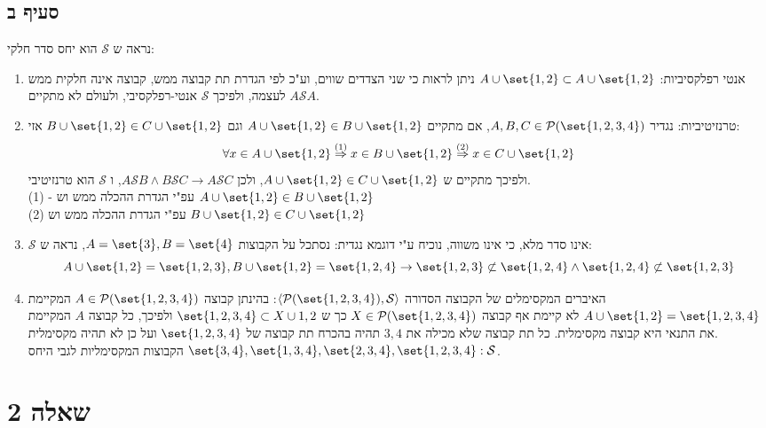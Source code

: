\documentclass{article}
\DeclarePairedDelimiter\set\{\}
\begin{document}
	\subsection*{סעיף ב}
נראה ש $\mathcal{S}$ הוא יחס סדר חלקי:
\begin{enumerate}
	\item אנטי רפלקסיביות:
	$A \cup \set{1,2} \subset A \cup \set{1,2}$
	ניתן לראות כי שני הצדדים שווים, וע"כ לפי הגדרת תת קבוצה ממש, קבוצה אינה חלקית ממש לעצמה,
	ולפיכך $\mathcal{S}$ אנטי-רפלקסיבי, ולעולם לא מתקיים $A\mathcal{S}A$.
	\item טרנזיטיביות:
	נגדיר $A,B,C \in \PP(\set{1,2,3,4})$,
	אם מתקיים $A \cup \set{1,2} \in B \cup \set{1,2}$
	וגם $B \cup \set{1,2} \in C \cup \set{1,2}$ אזי:
\[
	\forall x \in A \cup \set{1,2} \ontop{(1)}\Rightarrow
	x \in B \cup \set{1,2} \ontop{(2)}\Rightarrow
	x \in C \cup \set{1,2}
\]
ולפיכך מתקיים ש $A \cup \set{1,2} \in C \cup \set{1,2}$, ולכן
$A \mathcal{S} B \land B \mathcal{S} C \to A \mathcal{S} C$, ו $\mathcal{S}$ הוא טרנזיטיבי. \\
(1) -
עפ"י הגדרת ההכלה ממש וש $A \cup \set{1,2} \in B \cup \set{1,2}$ \\
(2) עפ"י הגדרת ההכלה ממש וש $B \cup \set{1,2} \in C \cup \set{1,2}$ \\
	\item $\mathcal{S}$ אינו סדר מלא, כי אינו משווה, נוכיח ע"י דוגמא נגדית:
	נסתכל על הקבוצות $A = \set{3}, B = \set{4}$, נראה ש:
	\[
		A \cup \set{1,2} = \set{1,2,3},  B \cup \set{1,2} = \set{1,2,4} \to \set{1,2,3} \not \subset \set{1,2,4} \land \set{1,2,4} \not \subset \set{1,2,3}
	\]
	\item האיברים המקסימלים של הקבוצה הסדורה $\langle \PP(\set{1,2,3,4}), \mathcal{S} \rangle$:
בהינתן קבוצה $A \in \PP(\set{1,2,3,4})$ המקיימת $A \cup \set{1,2} = \set{1,2,3,4}$
לא קיימת אף קבוצה $X \in \PP(\set{1,2,3,4})$ כך ש $\set{1,2,3,4} \subset X \cup{1,2}$
ולפיכך, כל קבוצה $A$ המקיימת את התנאי היא קבוצה מקסימלית.
כל תת קבוצה שלא מכילה את $3,4$  תהיה בהכרח תת קבוצה של $\set{1,2,3,4}$ ועל כן לא תהיה מקסימלית. \\
הקבוצות המקסימליות לגבי היחס $\set{3,4}, \set{1,3,4}, \set{2,3,4}, \set{1,2,3,4} :\mathcal{S}$.
\end{enumerate}

	\section*{שאלה 2}
\end{document}
